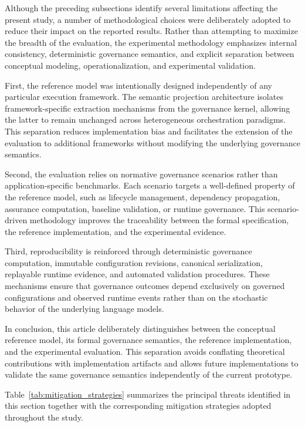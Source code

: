 \documentclass[10pt]{article}
\begin{document}
Although the preceding subsections identify several limitations affecting the present study, a number of methodological choices were deliberately adopted to reduce their impact on the reported results. Rather than attempting to maximize the breadth of the evaluation, the experimental methodology emphasizes internal consistency, deterministic governance semantics, and explicit separation between conceptual modeling, operationalization, and experimental validation.

First, the reference model was intentionally designed independently of any particular execution framework. The semantic projection architecture isolates framework-specific extraction mechanisms from the governance kernel, allowing the latter to remain unchanged across heterogeneous orchestration paradigms. This separation reduces implementation bias and facilitates the extension of the evaluation to additional frameworks without modifying the underlying governance semantics.

Second, the evaluation relies on normative governance scenarios rather than application-specific benchmarks. Each scenario targets a well-defined property of the reference model, such as lifecycle management, dependency propagation, assurance computation, baseline validation, or runtime governance. This scenario-driven methodology improves the traceability between the formal specification, the reference implementation, and the experimental evidence.

Third, reproducibility is reinforced through deterministic governance computation, immutable configuration revisions, canonical serialization, replayable runtime evidence, and automated validation procedures. These mechanisms ensure that governance outcomes depend exclusively on governed configurations and observed runtime events rather than on the stochastic behavior of the underlying language models.

In conclusion, this article deliberately distinguishes between the conceptual reference model, its formal governance semantics, the reference implementation, and the experimental evaluation. This separation avoids conflating theoretical contributions with implementation artifacts and allows future implementations to validate the same governance semantics independently of the current prototype.

Table~\ref{tab:mitigation_strategies} summarizes the principal threats identified in this section together with the corresponding mitigation strategies adopted throughout the study.
\end{document}

